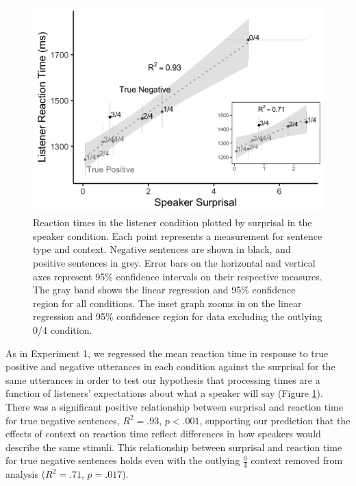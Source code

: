 \documentclass[man, floatsintext, noapacite]{apa6}
\begin{document}
\begin{figure}[t]
\begin{center} 
\includegraphics[width=6in]{figures/experiment2/speaker_v_listener.png}
\caption{\label{fig:exp2_scatter} Reaction times in the listener condition plotted by surprisal in the speaker condition. Each point represents a measurement for sentence type and context. Negative sentences are shown in black, and positive sentences in grey. Error bars on the horizontal and vertical axes represent 95\% confidence intervals on their respective measures. The gray band shows the linear regression and  95\% confidence region for all conditions. The inset graph zooms in on the linear regression and 95\% confidence region for data excluding the outlying 0/4 condition.}
\end{center} 
\end{figure}

As in Experiment 1, we regressed the mean reaction time in response to true positive and negative utterances in each condition against the surprisal for the same utterances in order to test our hypothesis that processing times are a function of listeners' expectations about what a speaker will say (Figure \ref{fig:exp2_scatter}).  There was a significant positive relationship between surprisal and reaction time for true negative sentences, $R^2=.93$, $p<.001$, supporting our prediction that the effects of context on reaction time reflect differences in how speakers would describe the same stimuli. This relationship between surprisal and reaction time for true negative sentences holds even with the outlying $\frac{0}{4}$ context removed from analysis ($R^2=.71$, $p = .017$).
\end{document}
